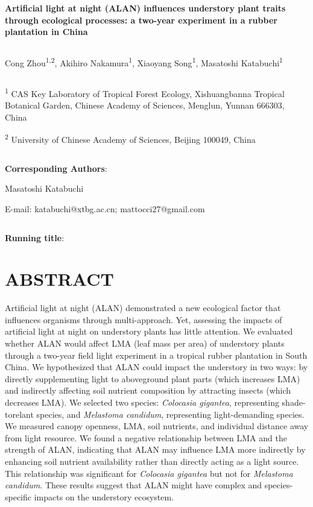 \documentclass[
  12pt,
  letterpaper,
  DIV=11,
  numbers=noendperiod]{scrartcl}
\author{}
\date{}
\begin{document}
\ifdefined\Shaded\renewenvironment{Shaded}{\begin{tcolorbox}[enhanced, interior hidden, borderline west={3pt}{0pt}{shadecolor}, frame hidden, boxrule=0pt, sharp corners, breakable]}{\end{tcolorbox}}\fi

\textbf{Artificial light at night (ALAN) influences understory plant
traits through ecological processes: a two-year experiment in a rubber
plantation in China}

\[ \]

Cong Zhou\textsuperscript{1,2}, Akihiro Nakamura\textsuperscript{1},
Xiaoyang Song\textsuperscript{1}, Masatoshi Katabuchi\textsuperscript{1}

\[ \]

\textsuperscript{1} CAS Key Laboratory of Tropical Forest Ecology,
Xishuangbanna Tropical Botanical Garden, Chinese Academy of Sciences,
Menglun, Yunnan 666303, China

\textsuperscript{2} University of Chinese Academy of Sciences, Beijing
100049, China

\[ \]

\textbf{Corresponding Authors}:

Masatoshi Katabuchi

E-mail: katabuchi@xtbg.ac.cn; mattocci27@gmail.com

\[ \]

\textbf{Running title}:

\newpage

\hypertarget{abstract}{%
\section{ABSTRACT}\label{abstract}}

Artificial light at night (ALAN) demonstrated a new ecological factor
that influences organisms through multi-approach. Yet, assessing the
impacts of artificial light at night on understory plants has little
attention. We evaluated whether ALAN would affect LMA (leaf mass per
area) of understory plants through a two-year field light experiment in
a tropical rubber plantation in South China. We hypothesized that ALAN
could impact the understory in two ways: by directly supplementing light
to aboveground plant parts (which increases LMA) and indirectly
affecting soil nutrient composition by attracting insects (which
decreases LMA). We selected two species: \emph{Colocasia gigantea},
representing shade-torelant species, and \emph{Melastoma candidum},
representing light-demanding species. We measured canopy openness, LMA,
soil nutrients, and individual distance away from light resource. We
found a negative relationship between LMA and the strength of ALAN,
indicating that ALAN may influence LMA more indirectly by enhancing soil
nutrient availability rather than directly acting as a light source.
This relationship was significant for \emph{Colocasia gigantea} but not
for \emph{Melastoma candidum}. These results suggest that ALAN might
have complex and species-specific impacts on the understory ecosystem.
\end{document}

